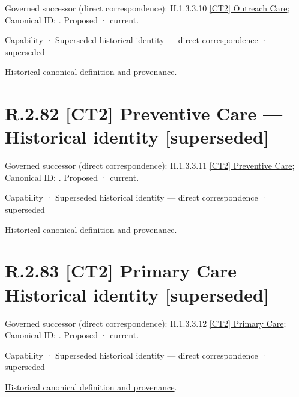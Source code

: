 {\small Governed successor (direct correspondence): II.1.3.3.10 \hyperref[element:b9ddbe2dd6a7485ba9cd3482215ea09e]{[CT2] Outreach Care}; Canonical ID: \texttt{}. Proposed · current.}\par
\label{element:75f8b32a3d5048ccbdfb30d61ae73dad}
{\small Capability · Superseded historical identity — direct correspondence · superseded}\par
\href{../../../../../../../continuum/strategy/capability/75f8b32a3d5048ccbdfb30d61ae73dad.md}{Historical canonical definition and provenance}.\par
\section*{R.2.82 [CT2] Preventive Care — Historical identity [superseded]}
\label{navigation:R.2.82}

{\small Governed successor (direct correspondence): II.1.3.3.11 \hyperref[element:dfdc4f0273ba4910848b3b65c9ef6ab2]{[CT2] Preventive Care}; Canonical ID: \texttt{}. Proposed · current.}\par
\label{element:97f0d1acc37b4ca994c6c1ca006f2daa}
{\small Capability · Superseded historical identity — direct correspondence · superseded}\par
\href{../../../../../../../continuum/strategy/capability/97f0d1acc37b4ca994c6c1ca006f2daa.md}{Historical canonical definition and provenance}.\par
\section*{R.2.83 [CT2] Primary Care — Historical identity [superseded]}
\label{navigation:R.2.83}

{\small Governed successor (direct correspondence): II.1.3.3.12 \hyperref[element:d118673d77d74c8cb8cec24f03adddd8]{[CT2] Primary Care}; Canonical ID: \texttt{}. Proposed · current.}\par
\label{element:fe9d58b5cfe14e8cb7a83a1ac6686d65}
{\small Capability · Superseded historical identity — direct correspondence · superseded}\par
\href{../../../../../../../continuum/strategy/capability/fe9d58b5cfe14e8cb7a83a1ac6686d65.md}{Historical canonical definition and provenance}.\par
